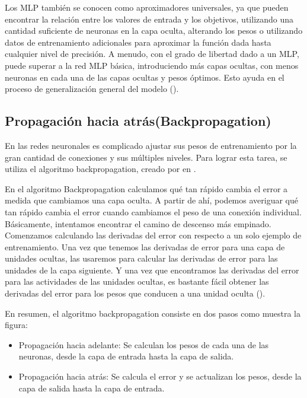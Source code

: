 Los MLP también se conocen como aproximadores universales, ya que pueden encontrar la relación entre los valores de entrada y los objetivos, utilizando una cantidad suficiente de neuronas en la capa oculta, alterando los pesos o utilizando datos de entrenamiento adicionales para aproximar la función dada hasta cualquier nivel de precisión. A menudo, con el grado de libertad dado a un MLP, puede superar a la red MLP básica, introduciendo más capas ocultas, con menos neuronas en cada una de las capas ocultas y pesos óptimos. Esto ayuda en el proceso de generalización general del modelo (\cite{goyal2018Deep}).

\subsection{Propagación hacia atrás(Backpropagation)}

En las redes neuronales es complicado ajustar sus pesos de entrenamiento por la gran cantidad de conexiones y sus múltiples niveles. Para lograr esta tarea, se utiliza el algoritmo backpropagation, creado por \citeauthor{rumelhart1986Parallel} en \citeyear{rumelhart1986Parallel}.

En el algoritmo Backpropagation calculamos qué tan rápido cambia el error a medida que cambiamos una capa oculta. A partir de ahí, podemos averiguar qué tan rápido cambia el error cuando cambiamos el peso de una conexión individual. Básicamente, intentamos encontrar el camino de descenso más empinado. Comenzamos calculando las derivadas del error con respecto a un solo ejemplo de entrenamiento. Una vez que tenemos las derivadas de error para una capa de unidades ocultas, las usaremos para calcular las derivadas de error para las unidades de la capa siguiente. Y una vez que encontramos las derivadas del error para las actividades de las unidades ocultas, es bastante fácil obtener las derivadas del error para los pesos que conducen a una unidad oculta (\cite{buduma2017Fundamentals}).

En resumen, el algoritmo backpropagation consiste en dos pasos como muestra la figura:

\begin{itemize}
\item Propagación hacia adelante: Se calculan los pesos de cada una de las neuronas, desde la capa de entrada hasta la capa de salida.

\item Propagación hacia atrás: Se calcula el error y se actualizan los pesos, desde la capa de salida hasta la capa de entrada.
\end{itemize}

